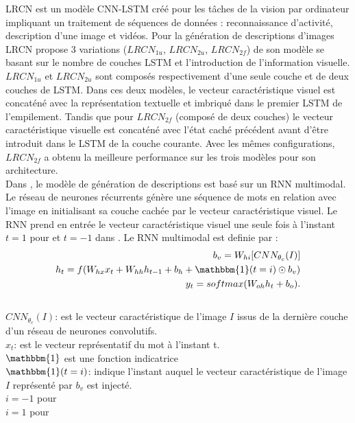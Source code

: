 \qquad	LRCN \cite{donahue2015long} est un modèle CNN-LSTM créé pour les tâches de la vision par ordinateur impliquant un traitement de séquences de données : reconnaissance d'activité, description d'une image et vidéos. Pour la génération de descriptions d'images LRCN propose 3 variations ($LRCN_{1u}$, $LRCN_{2u}$, $LRCN_{2f}$) de son modèle se basant sur le nombre de couches LSTM et l'introduction de l'information visuelle.
$LRCN_{1u}$ et $LRCN_{2u}$  sont composés respectivement d'une seule couche et de deux couches de LSTM. Dans ces deux modèles, le vecteur caractéristique visuel est concaténé avec la représentation textuelle et imbriqué dans le premier LSTM de l'empilement. Tandis que pour $LRCN_{2f}$ (composé de deux couches) le vecteur caractéristique visuelle est concaténé avec l'état caché précédent avant d'être introduit dans le LSTM de la couche courante. Avec les mêmes configurations, $LRCN_{2f}$ a obtenu la meilleure performance sur les trois modèles pour son architecture.\\

\qquad	Dans \cite{karpathy2015deep} \cite{vinyals2015show}, le modèle de génération de descriptions est basé sur un RNN multimodal.
Le réseau de neurones récurrents génère une séquence de mots en relation avec l'image en initialisant sa couche cachée par le vecteur caractéristique visuel.
Le RNN prend en entrée le vecteur caractéristique visuel une seule fois à l'instant $t=1$ pour \cite{karpathy2015deep} et $t=-1$ dans \cite{vinyals2015show}.
Le RNN multimodal est definie par :\\
\begin{eqnarray} 
b_v = W_{hi}[CNN_{\theta_c}(I)]\\
h_t = f(W_{hx} x_t + W_{hh} h_{t-1}+b_h+ \mathbbm{1}(t=i) \odot b_v)\\
y_t = softmax(W_{oh} h_t+b_o).
\end{eqnarray}\\
$CNN_{\theta_c}(I)$: est le vecteur caractéristique de l'image $I$ issus de la dernière couche d'un réseau de neurones convolutifs.\\
$x_t$: est le vecteur représentatif du mot à l'instant t.\\
$\mathbbm{1}$ est une fonction indicatrice\\
$\mathbbm{1}(t=i)$: indique l'instant auquel le vecteur caractéristique de l'image $I$ représenté par $b_v$ est injecté. \\
$i=-1$ pour \cite{vinyals2015show}\\
$i=1$ pour \cite{karpathy2015deep}